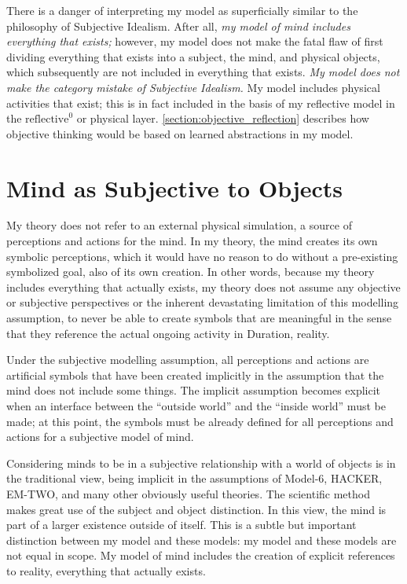 There is a danger of interpreting my model as superficially similar to
the philosophy of Subjective Idealism.  After all, \emph{my model of
  mind includes everything that exists;} however, my model does not
make the fatal flaw of first dividing everything that exists into a
subject, the mind, and physical objects, which subsequently are not
included in everything that exists.  \emph{My model does not make the
  category mistake of Subjective Idealism.}  My model includes
physical activities that exist; this is in fact included in the basis
of my reflective model in the $\text{reflective}^0$ or physical layer.
\autoref{section:objective_reflection} describes how objective
thinking would be based on learned abstractions in my model.

\section{Mind as Subjective to Objects}

My theory does not refer to an external physical simulation, a source
of perceptions and actions for the mind.  In my theory, the mind
creates its own symbolic perceptions, which it would have no reason to
do without a pre-existing symbolized goal, also of its own creation.
In other words, because my theory includes everything that actually
exists, my theory does not assume any objective or subjective
perspectives or the inherent devastating limitation of this modelling
assumption, to never be able to create symbols that are meaningful in
the sense that they reference the actual ongoing activity in Duration,
reality.

Under the subjective modelling assumption, all perceptions and actions
are artificial symbols that have been created implicitly in the
assumption that the mind does not include some things.  The implicit
assumption becomes explicit when an interface between the ``outside
world'' and the ``inside world'' must be made; at this point, the
symbols must be already defined for all perceptions and actions for a
subjective model of mind.

Considering minds to be in a subjective relationship with a world of
objects is in the traditional view, being implicit in the assumptions
of Model-6, HACKER, EM-TWO, and many other obviously useful theories.
The scientific method makes great use of the subject and object
distinction.  In this view, the mind is part of a larger existence
outside of itself.  This is a subtle but important distinction between
my model and these models: my model and these models are not equal in
scope.  My model of mind includes the creation of explicit references
to reality, everything that actually exists.

